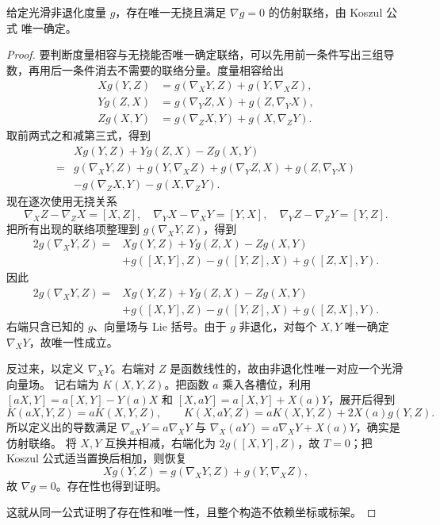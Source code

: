 \begin{theorem}
给定光滑非退化度量 $g$，存在唯一无挠且满足 $\nabla g=0$ 的仿射联络，由 Koszul 公式  唯一确定。
\end{theorem}

\begin{proof}
要判断度量相容与无挠能否唯一确定联络，可以先用前一条件写出三组导数，再用后一条件消去不需要的联络分量。度量相容给出
\begin{align*}
Xg(Y,Z)&=g(\nabla_XY,Z)+g(Y,\nabla_XZ),\\
Yg(Z,X)&=g(\nabla_YZ,X)+g(Z,\nabla_YX),\\
Zg(X,Y)&=g(\nabla_ZX,Y)+g(X,\nabla_ZY).
\end{align*}
取前两式之和减第三式，得到
\begin{align*}
&Xg(Y,Z)+Yg(Z,X)-Zg(X,Y)\\
={}&g(\nabla_XY,Z)+g(Y,\nabla_XZ)
+g(\nabla_YZ,X)+g(Z,\nabla_YX)\\
&-g(\nabla_ZX,Y)-g(X,\nabla_ZY).
\end{align*}
现在逐次使用无挠关系
\[
\nabla_XZ-\nabla_ZX=[X,Z],
\quad
\nabla_YX-\nabla_XY=[Y,X],
\quad
\nabla_YZ-\nabla_ZY=[Y,Z].
\]
把所有出现的联络项整理到 $g(\nabla_XY,Z)$，得到
\begin{align*}
2g(\nabla_XY,Z)
={}&Xg(Y,Z)+Yg(Z,X)-Zg(X,Y)\\
&+g([X,Y],Z)-g([Y,Z],X)+g([Z,X],Y).
\end{align*}
因此
\begin{equation}\label{eq:math-dg-koszul-formula}
{
\begin{aligned}
2g(\nabla_XY,Z)
={}&Xg(Y,Z)+Yg(Z,X)-Zg(X,Y)\\
&+g([X,Y],Z)-g([Y,Z],X)+g([Z,X],Y).
\end{aligned}}
\end{equation}
右端只含已知的 $g$、向量场与 Lie 括号。由于 $g$ 非退化，对每个 $X,Y$ 唯一确定 $\nabla_XY$，故唯一性成立。

反过来，以定义 $\nabla_XY$。右端对 $Z$ 是函数线性的，故由非退化性唯一对应一个光滑向量场。
记右端为 $K(X,Y,Z)$。把函数 $a$ 乘入各槽位，利用 $[aX,Y]=a[X,Y]-Y(a)X$ 和 $[X,aY]=a[X,Y]+X(a)Y$，展开后得到
\[
K(aX,Y,Z)=aK(X,Y,Z),\qquad
K(X,aY,Z)=aK(X,Y,Z)+2X(a)g(Y,Z).
\]
所以定义出的导数满足 $\nabla_{aX}Y=a\nabla_XY$ 与 $\nabla_X(aY)=a\nabla_XY+X(a)Y$，确实是仿射联络。
将 $X,Y$ 互换并相减，右端化为 $2g([X,Y],Z)$，故 $T=0$；把 Koszul 公式适当置换后相加，则恢复
\[
Xg(Y,Z)=g(\nabla_XY,Z)+g(Y,\nabla_XZ),
\]
故 $\nabla g=0$。存在性也得到证明。

这就从同一公式证明了存在性和唯一性，且整个构造不依赖坐标或标架。
\end{proof}

